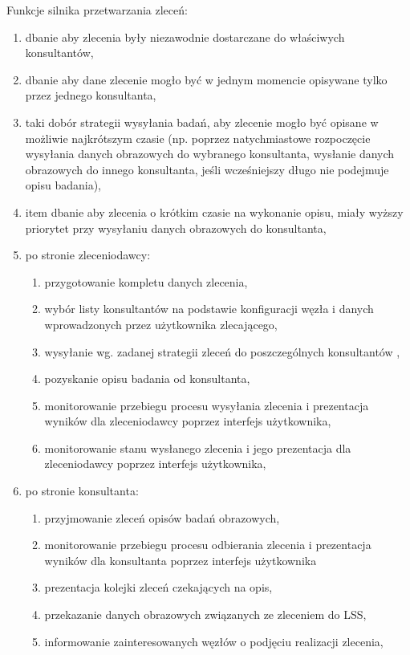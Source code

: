 \documentclass[a4paper]{report}
\begin{document}
Funkcje silnika przetwarzania zleceń:
\begin{enumerate}
  \item dbanie aby zlecenia były niezawodnie dostarczane do właściwych konsultantów,
  \item dbanie aby dane zlecenie mogło być w jednym momencie opisywane tylko przez jednego konsultanta,
  \item taki dobór strategii wysyłania badań, aby zlecenie mogło być opisane w możliwie najkrótszym czasie (np. poprzez natychmiastowe rozpoczęcie wysyłania danych obrazowych do wybranego konsultanta, wysłanie danych obrazowych do innego konsultanta, jeśli wcześniejszy długo nie podejmuje opisu badania),
  \item item dbanie aby zlecenia o krótkim czasie na wykonanie opisu, miały wyższy priorytet przy wysyłaniu danych obrazowych do konsultanta,
  \item po stronie zleceniodawcy:
  \begin{enumerate}
    \item przygotowanie kompletu danych zlecenia,
    \item wybór listy konsultantów na podstawie konfiguracji węzła i danych wprowadzonych przez użytkownika zlecającego,
    \item wysyłanie wg. zadanej strategii zleceń do poszczególnych konsultantów ,
    \item pozyskanie opisu badania od konsultanta,
    \item monitorowanie przebiegu procesu wysyłania zlecenia i prezentacja wyników dla zleceniodawcy poprzez interfejs użytkownika, 
    \item monitorowanie stanu wysłanego zlecenia i jego prezentacja dla zleceniodawcy poprzez interfejs użytkownika,
  \end{enumerate}
  \item po stronie konsultanta:
  \begin{enumerate}
    \item przyjmowanie zleceń opisów badań obrazowych,
    \item monitorowanie przebiegu procesu odbierania zlecenia i prezentacja wyników dla konsultanta poprzez interfejs użytkownika
    \item prezentacja kolejki zleceń czekających na opis, 
    \item przekazanie danych obrazowych związanych ze zleceniem do LSS,
    \item informowanie zainteresowanych węzłów o podjęciu realizacji zlecenia,
  \end{enumerate}
\end{enumerate}
\end{document}
